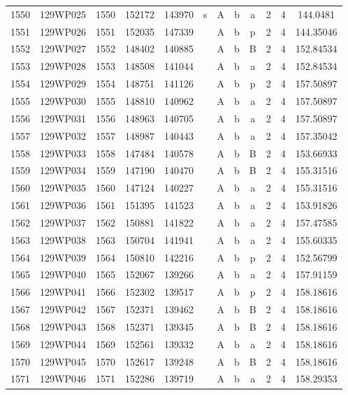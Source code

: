 \begin{tabular}{|*{12}{c|}}
1550 & 129WP025 & 1550 & 152172 & 143970 & s & A & b & a & 2 & 4 & 144.0481 \\ 
1551 & 129WP026 & 1551 & 152035 & 147339 &  & A & b & p & 2 & 4 & 144.35046 \\ 
1552 & 129WP027 & 1552 & 148402 & 140885 &  & A & b & B & 2 & 4 & 152.84534 \\ 
1553 & 129WP028 & 1553 & 148508 & 141044 &  & A & b & a & 2 & 4 & 152.84534 \\ 
1554 & 129WP029 & 1554 & 148751 & 141126 &  & A & b & p & 2 & 4 & 157.50897 \\ 
1555 & 129WP030 & 1555 & 148810 & 140962 &  & A & b & a & 2 & 4 & 157.50897 \\ 
1556 & 129WP031 & 1556 & 148963 & 140705 &  & A & b & a & 2 & 4 & 157.50897 \\ 
1557 & 129WP032 & 1557 & 148987 & 140443 &  & A & b & a & 2 & 4 & 157.35042 \\ 
1558 & 129WP033 & 1558 & 147484 & 140578 &  & A & b & B & 2 & 4 & 153.66933 \\ 
1559 & 129WP034 & 1559 & 147190 & 140470 &  & A & b & B & 2 & 4 & 155.31516 \\ 
1560 & 129WP035 & 1560 & 147124 & 140227 &  & A & b & a & 2 & 4 & 155.31516 \\ 
1561 & 129WP036 & 1561 & 151395 & 141523 &  & A & b & a & 2 & 4 & 153.91826 \\ 
1562 & 129WP037 & 1562 & 150881 & 141822 &  & A & b & a & 2 & 4 & 157.47585 \\ 
1563 & 129WP038 & 1563 & 150704 & 141941 &  & A & b & a & 2 & 4 & 155.60335 \\ 
1564 & 129WP039 & 1564 & 150810 & 142216 &  & A & b & p & 2 & 4 & 152.56799 \\ 
1565 & 129WP040 & 1565 & 152067 & 139266 &  & A & b & a & 2 & 4 & 157.91159 \\ 
1566 & 129WP041 & 1566 & 152302 & 139517 &  & A & b & p & 2 & 4 & 158.18616 \\ 
1567 & 129WP042 & 1567 & 152371 & 139462 &  & A & b & B & 2 & 4 & 158.18616 \\ 
1568 & 129WP043 & 1568 & 152371 & 139345 &  & A & b & B & 2 & 4 & 158.18616 \\ 
1569 & 129WP044 & 1569 & 152561 & 139332 &  & A & b & a & 2 & 4 & 158.18616 \\ 
1570 & 129WP045 & 1570 & 152617 & 139248 &  & A & b & B & 2 & 4 & 158.18616 \\ 
1571 & 129WP046 & 1571 & 152286 & 139719 &  & A & b & a & 2 & 4 & 158.29353 \\ 

\end{tabular}
